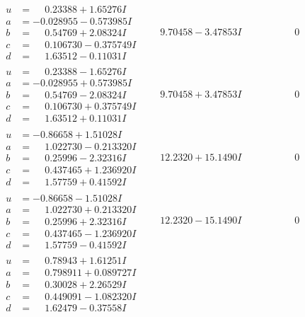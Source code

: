 \documentclass[1p]{elsarticle_modified}
\theoremstyle{definition}
\begin{document}
$$\begin{array}{c|c|c}
\begin{aligned}
u &= \phantom{-}0.23388 + 1.65276 I \\
a &= -0.028955 - 0.573985 I \\
b &= \phantom{-}0.54769 + 2.08324 I \\
c &= \phantom{-}0.106730 - 0.375749 I \\
d &= \phantom{-}1.63512 - 0.11031 I\end{aligned}
 & \phantom{-}9.70458 - 3.47853 I & \phantom{-0.000000 } 0 \\ \hline\begin{aligned}
u &= \phantom{-}0.23388 - 1.65276 I \\
a &= -0.028955 + 0.573985 I \\
b &= \phantom{-}0.54769 - 2.08324 I \\
c &= \phantom{-}0.106730 + 0.375749 I \\
d &= \phantom{-}1.63512 + 0.11031 I\end{aligned}
 & \phantom{-}9.70458 + 3.47853 I & \phantom{-0.000000 } 0 \\ \hline\begin{aligned}
u &= -0.86658 + 1.51028 I \\
a &= \phantom{-}1.022730 - 0.213320 I \\
b &= \phantom{-}0.25996 - 2.32316 I \\
c &= \phantom{-}0.437465 + 1.236920 I \\
d &= \phantom{-}1.57759 + 0.41592 I\end{aligned}
 & \phantom{-}12.2320 + 15.1490 I & \phantom{-0.000000 } 0 \\ \hline\begin{aligned}
u &= -0.86658 - 1.51028 I \\
a &= \phantom{-}1.022730 + 0.213320 I \\
b &= \phantom{-}0.25996 + 2.32316 I \\
c &= \phantom{-}0.437465 - 1.236920 I \\
d &= \phantom{-}1.57759 - 0.41592 I\end{aligned}
 & \phantom{-}12.2320 - 15.1490 I & \phantom{-0.000000 } 0 \\ \hline\begin{aligned}
u &= \phantom{-}0.78943 + 1.61251 I \\
a &= \phantom{-}0.798911 + 0.089727 I \\
b &= \phantom{-}0.30028 + 2.26529 I \\
c &= \phantom{-}0.449091 - 1.082320 I \\
d &= \phantom{-}1.62479 - 0.37558 I\end{aligned}

\end{array}$$
\end{document}
